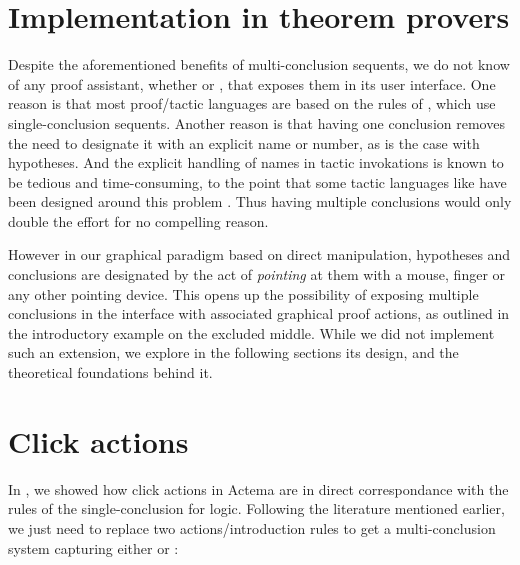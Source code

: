 \section{Implementation in theorem provers}

Despite the aforementioned benefits of multi-conclusion sequents, we do not know
of any proof assistant, whether  or , that exposes them
in its user interface. One reason is that most proof/tactic languages are based
on the rules of , which use single-conclusion sequents. Another
reason is that having one conclusion removes the need to designate it with an
explicit name or number, as is the case with hypotheses. And the explicit handling
of names in tactic invokations is known to be tedious and time-consuming, to the
point that some tactic languages like \ssreflect have been designed around this
problem . Thus having multiple conclusions would only double the
effort for no compelling reason.

However in our graphical paradigm based on direct manipulation, hypotheses and
conclusions are designated by the act of \emph{pointing} at them with a mouse,
finger or any other pointing device. This opens up the possibility of exposing
multiple conclusions in the interface with associated graphical proof actions,
as outlined in the introductory example on the excluded middle. While we did not
implement such an extension, we explore in the following sections its design,
and the theoretical foundations behind it.

\section{Click actions}

In , we showed how click actions in Actema are in direct
correspondance with the rules of the single-conclusion  
for  logic. Following the literature mentioned earlier, we just
need to replace two actions/introduction rules to get a multi-conclusion system
capturing either  or  :

